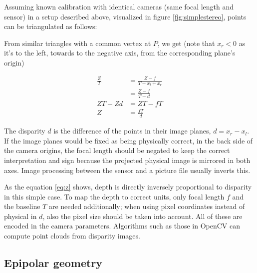 
Assuming known calibration with identical cameras (same focal length and sensor) in a setup described above, visualized in figure \ref{fig:simplestereo}, points can be triangulated as follows:

From similar triangles with a common vertex at $P$, we get (note that $x_r < 0$ as it's to the left, towards to the negative axis, from the corresponding plane's origin)

\begin{align}
	\frac{Z}{T} &= \frac{Z-f}{T - x_l + x_r} \\
	&= \frac{Z-f}{T - d}\\
	ZT - Zd &= ZT - fT\\
	Z &= \frac{fT}{d} \label{eq:z}
\end{align}

The disparity $d$ is the difference of the points in their image planes, $d = x_r - x_l$.
If the image planes would be fixed as being physically correct, in the back side of the camera origins, the focal length should be negated to keep the correct interpretation and sign because the projected physical image is mirrored in both axes. Image processing between the sensor and a picture file usually inverts this.

As the equation \ref{eq:z} shows, depth is directly inversely proportional to disparity in this simple case.
To map the depth to correct units, only focal length $f$ and the baseline $T$ are needed additionally; when using pixel coordinates instead of physical in $d$, also the pixel size should be taken into account.
All of these are encoded in the camera parameters.
Algorithms such as those in OpenCV \cite{opencv} can compute point clouds from disparity images.


\subsection{Epipolar geometry} %

